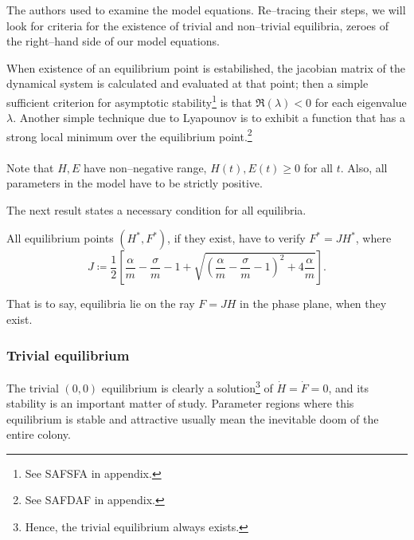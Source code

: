 The authors used  to examine the model equations.
Re--tracing their steps, we will look for criteria for the existence of trivial and non--trivial equilibria, \ie zeroes of the right--hand side of our model equations.

When existence of an equilibrium point is estabilished, the jacobian matrix of the dynamical system is calculated and
evaluated at that point; then a simple sufficient criterion for asymptotic stability\footnote{See SAFSFA in appendix.}
is that $\Re (\lambda) < 0$ for each eigenvalue $\lambda$.
Another simple technique due to Lyapounov is to exhibit a function that has a strong local minimum over the equilibrium point.\footnote{See SAFDAF in appendix.}

\paragraph{}
Note that $H, E$ have non--negative range, \ie $H(t), E(t) \geq 0$ for all $t$.
Also, all parameters in the model have to be strictly positive.

The next result states a necessary condition for all equilibria.

\begin{lemma}
    \label{lem:necessJ}
    All equilibrium points $(H^*, F^*)$, if they exist, have to verify $F^* = J H^*$, where
    \begin{equation}
        J \coloneq \frac{1}{2} \left[
            \frac{\alpha}{m} - \frac{\sigma}{m} - 1 +
            \sqrt{ {\left( \frac{\alpha}{m} - \frac{\sigma}{m} - 1 \right)}^2
                + 4 \frac{\alpha}{m}
            }
        \right].
        \label{eq:kh11posEqJ}
    \end{equation}
\end{lemma}

That is to say, equilibria lie on the ray $F= JH$ in the phase plane, when they exist.

\subsubsection{Trivial equilibrium}
The trivial $(0,0)$ equilibrium is clearly a solution\footnote{Hence, the trivial equilibrium always exists.}
of $\dot{H}=\dot{F}=0$, and its stability is an important matter of study. Parameter regions where this equilibrium is stable and attractive usually mean the inevitable doom of the entire colony.

